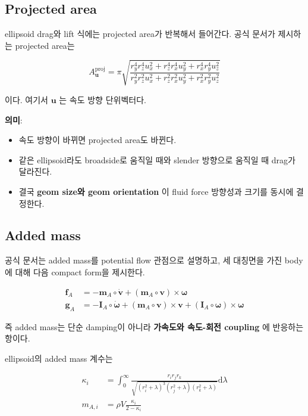 \documentclass[11pt,a4paper]{article}
\begin{document}
\subsection{Projected area}

ellipsoid drag와 lift 식에는 projected area가 반복해서 들어간다. 공식 문서가 제시하는 projected area는

\[
A^{\mathrm{proj}}_{\mathbf{u}}
=
\pi
\sqrt{
\frac{
r_y^4 r_z^4 u_x^2 + r_z^4 r_x^4 u_y^2 + r_x^4 r_y^4 u_z^2
}{
r_y^2 r_z^2 u_x^2 + r_z^2 r_x^2 u_y^2 + r_x^2 r_y^2 u_z^2
}}
\]

이다. 여기서 \(\mathbf{u}\) 는 속도 방향 단위벡터다.

\textbf{의미}:
\begin{itemize}[leftmargin=2em]
  \item 속도 방향이 바뀌면 projected area도 바뀐다.
  \item 같은 ellipsoid라도 broadside로 움직일 때와 slender 방향으로 움직일 때 drag가 달라진다.
  \item 결국 \textbf{geom size와 geom orientation} 이 fluid force 방향성과 크기를 동시에 결정한다.
\end{itemize}

\subsection{Added mass}

공식 문서는 added mass를 potential flow 관점으로 설명하고, 세 대칭면을 가진 body에 대해 다음 compact form을 제시한다.

\begin{align*}
\mathbf{f}_A &= - \mathbf{m}_A \circ \dot{\mathbf{v}} + (\mathbf{m}_A \circ \mathbf{v}) \times \boldsymbol{\omega} \\
\mathbf{g}_A &= - \mathbf{I}_A \circ \dot{\boldsymbol{\omega}} + (\mathbf{m}_A \circ \mathbf{v}) \times \mathbf{v} + (\mathbf{I}_A \circ \boldsymbol{\omega}) \times \boldsymbol{\omega}
\end{align*}

즉 added mass는 단순 damping이 아니라 \textbf{가속도와 속도-회전 coupling} 에 반응하는 항이다.

ellipsoid의 added mass 계수는

\begin{align*}
\kappa_i &= \int_0^\infty
\frac{r_i r_j r_k}
{\sqrt{(r_i^2 + \lambda)^3 (r_j^2 + \lambda)(r_k^2 + \lambda)}}
\mathrm{d}\lambda \\
m_{A,i} &= \rho V \frac{\kappa_i}{2 - \kappa_i}
\end{align*}
\end{document}
